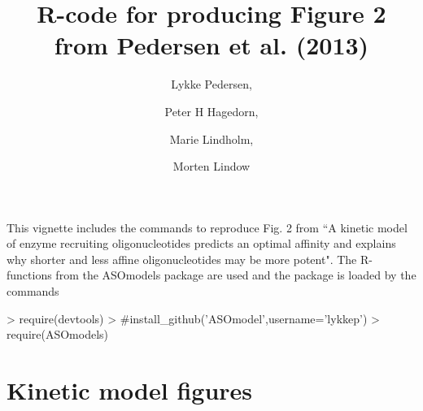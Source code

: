 \documentclass{article}
\title{R-code for producing Figure 2 from Pedersen et al. (2013)}
\author{Lykke Pedersen, \and Peter H Hagedorn, \and Marie Lindholm, \and Morten Lindow}
\date{}
\begin{document}



\maketitle
This vignette includes the commands to reproduce Fig. 2 from ``A kinetic model of enzyme recruiting oligonucleotides predicts an optimal affinity and explains why shorter and less affine oligonucleotides may be more potent". The R-functions from the ASOmodels package are used and the package is loaded by the commands

\begin{Schunk}
\begin{Sinput}
> require(devtools)
> #install_github('ASOmodel',username='lykkep')
> require(ASOmodels)
\end{Sinput}
\end{Schunk}

\section*{Kinetic model figures}
\end{document}
